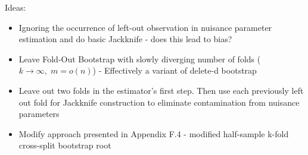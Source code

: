 {\color{red}
Ideas:
\begin{itemize}
	\item Ignoring the occurrence of left-out observation in nuisance parameter estimation and do basic Jackknife - does this lead to bias?
	\item Leave Fold-Out Bootstrap with slowly diverging number of folds ($k \rightarrow \infty, \;m = o(n)$) - Effectively a variant of delete-d bootstrap
	\item Leave out two folds in the estimator's first step. 
	Then use each previously left out fold for Jackknife construction to eliminate contamination from nuisance parameters
	\item Modify approach presented in \citet{ritzwoller_simultaneous_2024} Appendix F.4 - modified half-sample k-fold cross-split bootstrap root
\end{itemize}
}


